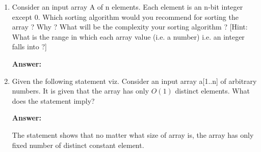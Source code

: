 \documentclass[a4paper]{article}
\begin{document}
\begin{enumerate}[label=(\alph*)]
\begin{enumerate}[label=(\roman*)]
         \vspace{0.5cm}
         \item {$t_{A(n)} = 2n^2 $} and {$ t_{B(n)} = n^3 $}
         \begin{align*}
             2n^2 &< n^3 \\
             2n^2 - n^3 &< 0 \\
             n^2(2 - n) &< 0 \\
             n &> 2
         \end{align*}
         \begin{changemargin}{0.8cm}{0cm}
             So that, $ n \in  (2, \infty) $
         \end{changemargin}
         
         \vspace{0.5cm}
         \item {$t_{A(n)} = 2n $} and {$ t_{B(n)} = 100n $}
         \begin{align*}
             2n &< 100n \\
             2n - 100n &< 0 \\
             -98n &< 0
         \end{align*}
         \begin{changemargin}{0.8cm}{0cm}
             So that, A is always faster than B.
         \end{changemargin}
         
     \end{enumerate}
     
     \vspace{0.5cm}
     \item Consider an input array A of n elements. Each element is an n-bit integer except 0. Which sorting algorithm would you recommend for sorting the array ? Why ? What will be the complexity your sorting algorithm ? [Hint: What is the range in which each array value (i.e. a number) i.e. an integer falls into ?]
     
     \textbf{Answer:}
     
     \vspace{0.5cm}
     \item Given the following statement viz. Consider an input array a[1..n] of arbitrary numbers. It is given that the array has only {$ O(1) $} distinct elements. What does the statement imply?
     
     \textbf{Answer:}
     
     The statement shows that no matter what size of array is, the array has only fixed number of distinct constant element.
     
     
     
\end{enumerate}
\end{document}
